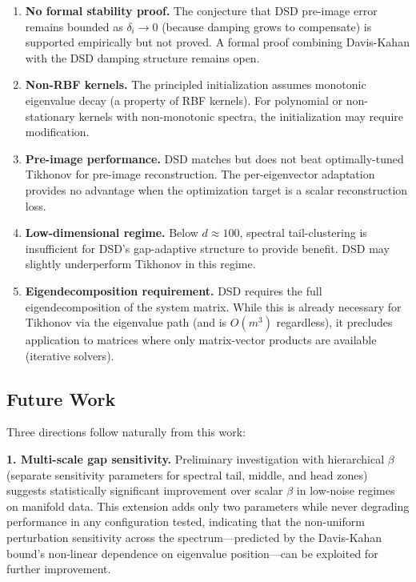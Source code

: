 \documentclass[journal]{IEEEtran}
\begin{document}
\begin{enumerate}
\item \textbf{No formal stability proof.} The conjecture that DSD pre-image error remains bounded as $\delta_i \to 0$ (because damping grows to compensate) is supported empirically but not proved. A formal proof combining Davis-Kahan with the DSD damping structure remains open.

\item \textbf{Non-RBF kernels.} The principled initialization assumes monotonic eigenvalue decay (a property of RBF kernels). For polynomial or non-stationary kernels with non-monotonic spectra, the initialization may require modification.

\item \textbf{Pre-image performance.} DSD matches but does not beat optimally-tuned Tikhonov for pre-image reconstruction. The per-eigenvector adaptation provides no advantage when the optimization target is a scalar reconstruction loss.

\item \textbf{Low-dimensional regime.} Below $d \approx 100$, spectral tail-clustering is insufficient for DSD's gap-adaptive structure to provide benefit. DSD may slightly underperform Tikhonov in this regime.

\item \textbf{Eigendecomposition requirement.} DSD requires the full eigendecomposition of the system matrix. While this is already necessary for Tikhonov via the eigenvalue path (and is $O(m^3)$ regardless), it precludes application to matrices where only matrix-vector products are available (iterative solvers).
\end{enumerate}

\subsection{Future Work}

Three directions follow naturally from this work:

\textbf{1. Multi-scale gap sensitivity.} Preliminary investigation with hierarchical $\beta$ (separate sensitivity parameters for spectral tail, middle, and head zones) suggests statistically significant improvement over scalar $\beta$ in low-noise regimes on manifold data. This extension adds only two parameters while never degrading performance in any configuration tested, indicating that the non-uniform perturbation sensitivity across the spectrum---predicted by the Davis-Kahan bound's non-linear dependence on eigenvalue position---can be exploited for further improvement.
\end{document}
